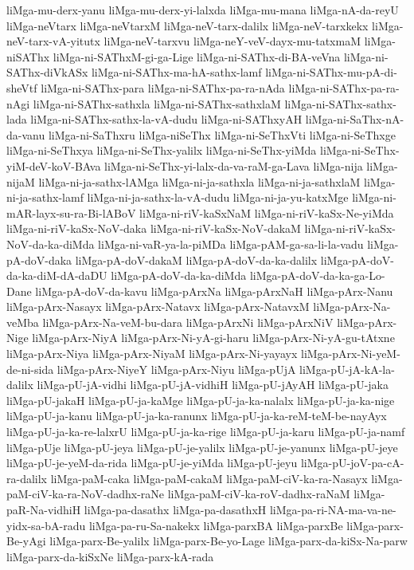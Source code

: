 {liMga-mu-derx-yanu
liMga-mu-derx-yi-lalxda
liMga-mu-mana
liMga-nA-da-reyU
liMga-neVtarx
liMga-neVtarxM
liMga-neV-tarx-dalilx
liMga-neV-tarxkekx
liMga-neV-tarx-vA-yitutx
liMga-neV-tarxvu
liMga-neY-veV-dayx-mu-tatxmaM
liMga-niSAThx
liMga-ni-SAThxM-gi-ga-Lige
liMga-ni-SAThx-di-BA-veVna
liMga-ni-SAThx-diVkASx
liMga-ni-SAThx-ma-hA-sathx-lamf
liMga-ni-SAThx-mu-pA-di-sheVtf
liMga-ni-SAThx-para
liMga-ni-SAThx-pa-ra-nAda
liMga-ni-SAThx-pa-ra-nAgi
liMga-ni-SAThx-sathxla
liMga-ni-SAThx-sathxlaM
liMga-ni-SAThx-sathx-lada
liMga-ni-SAThx-sathx-la-vA-dudu
liMga-ni-SAThxyAH
liMga-ni-SaThx-nA-da-vanu
liMga-ni-SaThxru
liMga-niSeThx
liMga-ni-SeThxVti
liMga-ni-SeThxge
liMga-ni-SeThxya
liMga-ni-SeThx-yalilx
liMga-ni-SeThx-yiMda
liMga-ni-SeThx-yiM-deV-koV-BAva
liMga-ni-SeThx-yi-lalx-da-va-raM-ga-Lava
liMga-nija
liMga-nijaM
liMga-ni-ja-sathx-lAMga
liMga-ni-ja-sathxla
liMga-ni-ja-sathxlaM
liMga-ni-ja-sathx-lamf
liMga-ni-ja-sathx-la-vA-dudu
liMga-ni-ja-yu-katxMge
liMga-ni-mAR-layx-su-ra-Bi-lABoV
liMga-ni-riV-kaSxNaM
liMga-ni-riV-kaSx-Ne-yiMda
liMga-ni-riV-kaSx-NoV-daka
liMga-ni-riV-kaSx-NoV-dakaM
liMga-ni-riV-kaSx-NoV-da-ka-diMda
liMga-ni-vaR-ya-la-piMDa
liMga-pAM-ga-sa-li-la-vadu
liMga-pA-doV-daka
liMga-pA-doV-dakaM
liMga-pA-doV-da-ka-dalilx
liMga-pA-doV-da-ka-diM-dA-daDU
liMga-pA-doV-da-ka-diMda
liMga-pA-doV-da-ka-ga-Lo-Dane
liMga-pA-doV-da-kavu
liMga-pArxNa
liMga-pArxNaH
liMga-pArx-Nanu
liMga-pArx-Nasayx
liMga-pArx-Natavx
liMga-pArx-NatavxM
liMga-pArx-Na-veMba
liMga-pArx-Na-veM-bu-dara
liMga-pArxNi
liMga-pArxNiV
liMga-pArx-Nige
liMga-pArx-NiyA
liMga-pArx-Ni-yA-gi-haru
liMga-pArx-Ni-yA-gu-tAtxne
liMga-pArx-Niya
liMga-pArx-NiyaM
liMga-pArx-Ni-yayayx
liMga-pArx-Ni-yeM-de-ni-sida
liMga-pArx-NiyeY
liMga-pArx-Niyu
liMga-pUjA
liMga-pU-jA-kA-la-dalilx
liMga-pU-jA-vidhi
liMga-pU-jA-vidhiH
liMga-pU-jAyAH
liMga-pU-jaka
liMga-pU-jakaH
liMga-pU-ja-kaMge
liMga-pU-ja-ka-nalalx
liMga-pU-ja-ka-nige
liMga-pU-ja-kanu
liMga-pU-ja-ka-ranunx
liMga-pU-ja-ka-reM-teM-be-nayAyx
liMga-pU-ja-ka-re-lalxrU
liMga-pU-ja-ka-rige
liMga-pU-ja-karu
liMga-pU-ja-namf
liMga-pUje
liMga-pU-jeya
liMga-pU-je-yalilx
liMga-pU-je-yanunx
liMga-pU-jeye
liMga-pU-je-yeM-da-rida
liMga-pU-je-yiMda
liMga-pU-jeyu
liMga-pU-joV-pa-cA-ra-dalilx
liMga-paM-caka
liMga-paM-cakaM
liMga-paM-ciV-ka-ra-Nasayx
liMga-paM-ciV-ka-ra-NoV-dadhx-raNe
liMga-paM-ciV-ka-roV-dadhx-raNaM
liMga-paR-Na-vidhiH
liMga-pa-dasathx
liMga-pa-dasathxH
liMga-pa-ri-NA-ma-va-ne-yidx-sa-bA-radu
liMga-pa-ru-Sa-nakekx
liMga-parxBA
liMga-parxBe
liMga-parx-Be-yAgi
liMga-parx-Be-yalilx
liMga-parx-Be-yo-Lage
liMga-parx-da-kiSx-Na-parw
liMga-parx-da-kiSxNe
liMga-parx-kA-rada
}
